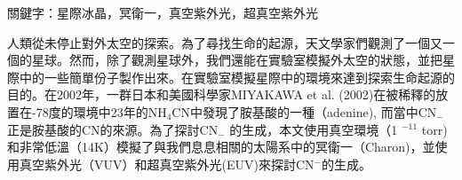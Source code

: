 \begin{abstractcn}

關鍵字：星際冰晶，冥衛一，真空紫外光，超真空紫外光
\vspace{2em}

人類從未停止對外太空的探索。為了尋找生命的起源，天文學家們觀測了一個又一個的星球。然而，除了觀測星球外，我們還能在實驗室模擬外太空的狀態，並把星際中的一些簡單份子製作出來。在實驗室模擬星際中的環境來達到探索生命起源的目的。在2002年，一群日本和美國科學家MIYAKAWA et al. (2002)\cite{miyakawa2002cold}在被稀釋的放置在-78度的環境中23年的NH$_4$CN中發現了胺基酸的一種（adenine), 而當中CN$_-$正是胺基酸的CN的來源。為了探討CN$_-$ 的生成，本文使用真空環境（1 $^{-11}$ torr)和非常低溫（14K）模擬了與我們息息相關的太陽系中的冥衛一（Charon)，並使用真空紫外光（VUV）和超真空紫外光(EUV)來探討CN$^-$的生成。

\end{abstractcn} 
